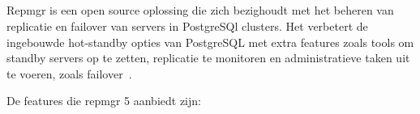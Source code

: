 \subsection{}
\label{subsec:Replication Manager (repmgr)}

Repmgr is een open source oplossing die zich bezighoudt met het beheren van replicatie en failover van servers in PostgreSQl clusters. Het verbetert de ingebouwde hot-standby opties van PostgreSQL met extra features zoals tools om standby servers op te zetten, replicatie te monitoren en administratieve taken uit te voeren, zoals failover~\autocite{2021a}. %

De features die repmgr 5 aanbiedt zijn:

\subsubsection{}
\label{subsubsec:De implementatie als een PostgreSQL extentie}


\subsubsection{}
\label{subsubsec:Replicatie cluster monitoring}


\subsubsection{}
\label{subsubsec:Standby klonen aan de hand van pg\_basebackup of Barman}

